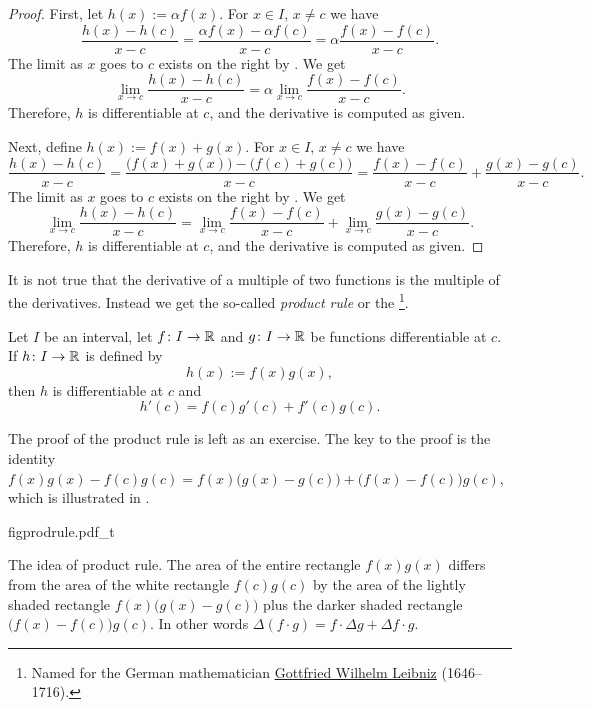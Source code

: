\begin{proof}
First, let $h(x) := \alpha f(x)$.
For $x \in I$, $x \not= c$ we have
\begin{equation*}
\frac{h(x)-h(c)}{x-c} =
\frac{\alpha f(x) - \alpha f(c)}{x-c}
=
\alpha \frac{f(x) - f(c)}{x-c} .
\end{equation*}
The limit as $x$ goes to $c$ exists on the right
by .  We get
\begin{equation*}
\lim_{x\to c}\frac{h(x)-h(c)}{x-c} =
\alpha \lim_{x\to c} \frac{f(x) - f(c)}{x-c} .
\end{equation*}
Therefore, $h$ is differentiable at $c$,
and the derivative is computed as given.

Next, define $h(x) := f(x)+g(x)$.
For $x \in I$, $x \not= c$ we have
\begin{equation*}
\frac{h(x)-h(c)}{x-c} =
\frac{\bigl(f(x) + g(x)\bigr) - \bigl(f(c) + g(c)\bigr)}{x-c}
=
\frac{f(x) - f(c)}{x-c}
+
\frac{g(x) - g(c)}{x-c} .
\end{equation*}
The limit as $x$ goes to $c$ exists on the right
by .  We get
\begin{equation*}
\lim_{x\to c}\frac{h(x)-h(c)}{x-c} =
\lim_{x\to c} \frac{f(x) - f(c)}{x-c}
+
\lim_{x\to c}\frac{g(x) - g(c)}{x-c} .
\end{equation*}
Therefore, $h$ is differentiable at $c$,
and the derivative is computed as given.
\end{proof}

It is not true that the derivative of a multiple of two functions is
the multiple of the derivatives.  Instead we get the so-called \emph{product
rule} or the \emph{}%
\footnote{Named for the German mathematician
\href{https://en.wikipedia.org/wiki/Leibniz}{Gottfried Wilhelm Leibniz}
(1646--1716).}.

\begin{prop}
Let $I$ be an interval, let
$f \colon I \to {\mathbb{R}}$ and $g \colon I \to {\mathbb{R}}$ be 
functions differentiable at $c$.  If $h \colon I \to {\mathbb{R}}$
is defined by
\begin{equation*}
h(x) := f(x) g(x) ,
\end{equation*}
then $h$ is differentiable at $c$ and
\begin{equation*}
h'(c) = f(c) g'(c) + f'(c) g(c) .
\end{equation*}
\end{prop}

The proof of the product rule is left as an exercise.  The key to the proof is 
the identity
$f(x) g(x) - f(c) g(c) =
f(x)\bigl( g(x) - g(c) \bigr)
+ \bigl( f(x) - f(c) \bigr) g(c)$,
which is illustrated in .
\begin{myfigureht}
{figprodrule.pdf_t}
\caption{The idea of product rule.  The area of the entire rectangle
$f(x)g(x)$ differs from the area of the white rectangle $f(c)g(c)$
by the area of the lightly shaded rectangle
$f(x)\bigl( g(x) - g(c) \bigr)$ plus the darker shaded rectangle
$\bigl( f(x) - f(c) \bigr) g(c)$.
In other words $\Delta (f \cdot g)
= f \cdot \Delta g + \Delta f \cdot g$.\label{figprodrule}}
\end{myfigureht}



